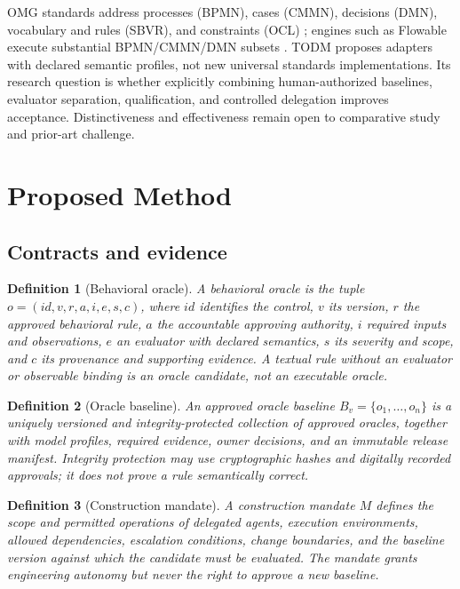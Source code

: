\documentclass[11pt,a4paper]{article}
\newtheorem{definition}{Definition}
\begin{document}
OMG standards address processes (BPMN), cases (CMMN), decisions (DMN), vocabulary and rules (SBVR), and constraints (OCL) \cite{omg2014bpmn,omg2016cmmn,omg2024dmn,omg2019sbvr,omg2014ocl}; engines such as Flowable execute substantial BPMN/CMMN/DMN subsets \cite{flowable2026}. TODM proposes adapters with declared semantic profiles, not new universal standards implementations. Its research question is whether explicitly combining human-authorized baselines, evaluator separation, qualification, and controlled delegation improves acceptance. Distinctiveness and effectiveness remain open to comparative study and prior-art challenge.

\section{Proposed Method}\label{sec:method}
\subsection{Contracts and evidence}
\begin{definition}[Behavioral oracle]
A behavioral oracle is the tuple $o=(id, v, r, a, i, e, s, c)$, where $id$ identifies the control, $v$ its version, $r$ the approved behavioral rule, $a$ the accountable approving authority, $i$ required inputs and observations, $e$ an evaluator with declared semantics, $s$ its severity and scope, and $c$ its provenance and supporting evidence. A textual rule without an evaluator or observable binding is an \emph{oracle candidate}, not an executable oracle.
\end{definition}
\begin{definition}[Oracle baseline]
An approved oracle baseline $B_v=\{o_1,\dots,o_n\}$ is a uniquely versioned and integrity-protected collection of approved oracles, together with model profiles, required evidence, owner decisions, and an immutable release manifest. Integrity protection may use cryptographic hashes and digitally recorded approvals; it does not prove a rule semantically correct.
\end{definition}
\begin{definition}[Construction mandate]
A construction mandate $M$ defines the scope and permitted operations of delegated agents, execution environments, allowed dependencies, escalation conditions, change boundaries, and the baseline version against which the candidate must be evaluated. The mandate grants engineering autonomy but never the right to approve a new baseline.
\end{definition}
\end{document}
